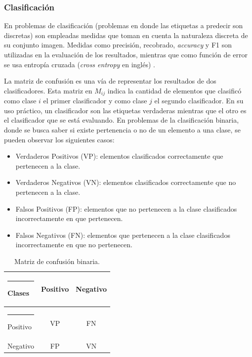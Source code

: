 \documentclass[a4paper,11pt,twocolumn,twoside]{article}
\begin{document}
\subsubsection{Clasificación}

En problemas de clasificación (problemas en donde las etiquetas a predecir son discretas) 
son empleadas medidas que toman en cuenta la naturaleza discreta de su conjunto imagen.
Medidas como precisión, recobrado, \textit{accuracy} y F1 son utilizadas en la 
evaluación de los resultados, mientras que como función de error se usa entropía cruzada 
(\textit{cross entropy} en inglés) \cite{grandini2020metrics}.

La matriz de confusión es una vía de representar los resultados de dos clasificadores. Esta matriz en $M_{ij}$
indica la cantidad de elementos que clasificó como clase $i$ el primer clasificador y
como clase $j$ el segundo clasificador. En su uso práctico,
un clasificador son las etiquetas verdaderas mientras que el otro es el clasificador que se está evaluando. 
En problemas de la clasificación binaria, donde se busca saber si existe pertenencia o no de un elemento a una clase,
se pueden observar los siguientes casos:

\begin{itemize}
	\item Verdaderos Positivos (VP): elementos clasificados correctamente que pertenecen a la clase.
	\item Verdaderos Negativos (VN): elementos clasificados correctamente que no pertenecen a la clase.
	\item Falsos Positivos (FP): elementos que no pertenecen a la clase clasificados incorrectamente en que pertenecen.
	\item Falsos Negativos (FN): elementos que pertenecen a la clase clasificados incorrectamente en que no pertenecen.
\end{itemize}

\begin{table}[h]
	\begin{center}
		\begin{tabular}{|l|c|c|} 
			\hline\rule{-2pt}{15pt}
			{\bf Clases}   & {\bf Positivo} & {\bf Negativo} \\ 
			\hline\rule{-4pt}{10pt}
			Positivo & VP       & FN       \\ 
			Negativo & FP       & VN       \\ 
			\hline
		\end{tabular}
	\end{center}
	\caption{\label{fig:confusion_matrix}Matriz de confusión binaria.}
\end{table}
\end{document}
